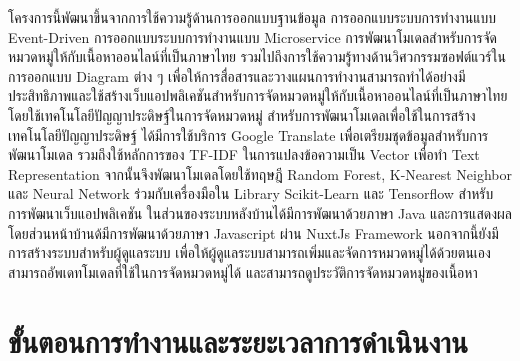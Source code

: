 \documentclass[12pt,oneside,openright,a4paper]{cpe-thai-project}
\begin{document}
  \hspace{1cm}โครงการนี้พัฒนาขึ้นจากการใช้ความรู้ด้านการออกแบบฐานข้อมูล การออกแบบระบบการทำงานแบบ Event-Driven การออกแบบระบบการทำงานแบบ Microservice 
  การพัฒนาโมเดลสำหรับการจัดหมวดหมู่ให้กับเนื้อหาออนไลน์ที่เป็นภาษาไทย รวมไปถึงการใช้ความรู้ทางด้านวิศวกรรมซอฟต์แวร์ในการออกแบบ Diagram ต่าง ๆ 
  เพื่อให้การสื่อสารและวางแผนการทำงานสามารถทำได้อย่างมีประสิทธิภาพและใช้สร้างเว็บแอปพลิเคชันสำหรับการจัดหมวดหมู่ให้กับเนื้อหาออนไลน์ที่เป็นภาษาไทยโดยใช้เทคโนโลยีปัญญาประดิษฐ์ในการจัดหมวดหมู่ 
  สำหรับการพัฒนาโมเดลเพื่อใช้ในการสร้างเทคโนโลยีปัญญาประดิษฐ์ ได้มีการใช้บริการ Google Translate เพื่อเตรียมชุดข้อมูลสำหรับการพัฒนาโมเดล
  รวมถึงใช้หลักการของ TF-IDF ในการแปลงข้อความเป็น Vector เพื่อทำ Text Representation จากนั้นจึงพัฒนาโมเดลโดยใช้ทฤษฎี
  Random Forest, K-Nearest Neighbor และ Neural Network ร่วมกับเครื่องมือใน Library Scikit-Learn และ Tensorflow
  สำหรับการพัฒนาเว็บแอปพลิเคชัน ในส่วนของระบบหลังบ้านได้มีการพัฒนาด้วยภาษา Java และการแสดงผลโดยส่วนหน้าบ้านด้มีการพัฒนาด้วยภาษา Javascript ผ่าน NuxtJs Framework
  นอกจากนี้ยังมีการสร้างระบบสำหรับผู้ดูแลระบบ เพื่อให้ผู้ดูแลระบบสามารถเพิ่มและจัดการหมวดหมู่ได้ด้วยตนเอง 
  สามารถอัพเดทโมเดลที่ใช้ในการจัดหมวดหมู่ได้ และสามารถดูประวัติการจัดหมวดหมู่ของเนื้อหา

\section{ขั้นตอนการทํางานและระยะเวลาการดําเนินงาน} 
\end{document}
